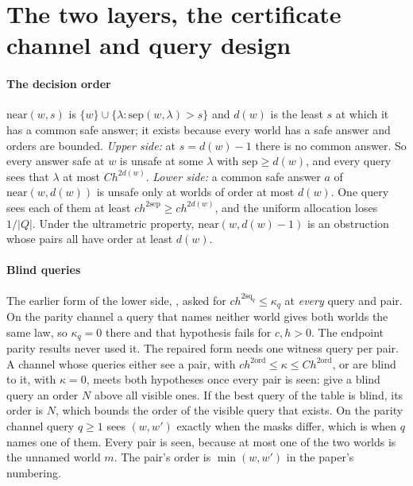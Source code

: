 
\section{The two layers, the certificate channel and query design}

\paragraph{The decision order} $\mathrm{near}(w,s)$ is $\{w\}\cup\{\lambda:\mathrm{sep}(w,\lambda)>s\}$
and $d(w)$ is the least $s$ at which it has a common safe answer; it exists because every world
has a safe answer and orders are bounded. \emph{Upper side:} at $s=d(w)-1$ there is no common
answer. So every answer safe at $w$ is unsafe at some $\lambda$ with $\mathrm{sep}\ge d(w)$, and
every query sees that $\lambda$ at most $Ch^{2d(w)}$. \emph{Lower side:} a common safe answer $a$
of $\mathrm{near}(w,d(w))$ is unsafe only at worlds of order at most $d(w)$. One query sees each
of them at least $ch^{2\mathrm{sep}}\ge ch^{2d(w)}$, and the uniform allocation loses $1/|Q|$.
Under the ultrametric property, $\mathrm{near}(w,d(w)-1)$ is an obstruction whose pairs all have
order at least $d(w)$.

\paragraph{Blind queries} The earlier form of the lower side, , asked for
$ch^{2\mathrm{sq}_q}\le\kappa_q$ at \emph{every} query and pair. On the parity channel a query
that names neither world gives both worlds the same law, so $\kappa_q=0$ there and that
hypothesis fails for $c,h>0$. The endpoint parity results never used it. The repaired form needs
one witness query per pair. A channel whose queries either see a pair, with
$ch^{2\mathrm{ord}}\le\kappa\le Ch^{2\mathrm{ord}}$, or are blind to it, with $\kappa=0$, meets
both hypotheses once every pair is seen: give a blind query an order $N$ above all visible ones.
If the best query of the table is blind, its order is $N$, which bounds the order of the visible
query that exists. On the parity channel query $q\ge1$ sees $(w,w')$ exactly when the masks
differ, which is when $q$ names one of them. Every pair is seen, because at most one of the two
worlds is the unnamed world $m$. The pair's order is $\min(w,w')$ in the paper's numbering.

